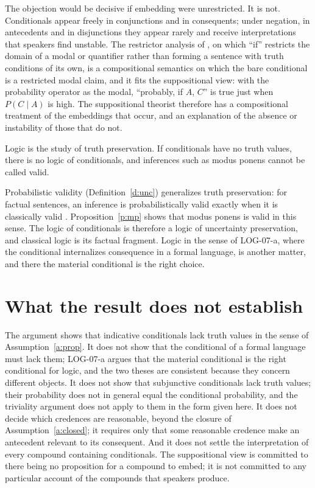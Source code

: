 \documentclass{situationist-preprint}
\begin{document}
\begin{reply}
The objection would be decisive if embedding were unrestricted. It is not. Conditionals appear freely in conjunctions and in consequents; under negation, in antecedents and in disjunctions they appear rarely and receive interpretations that speakers find unstable. The restrictor analysis of \citet{Kratzer1986}, on which \enquote{if} restricts the domain of a modal or quantifier rather than forming a sentence with truth conditions of its own, is a compositional semantics on which the bare conditional is a restricted modal claim, and it fits the suppositional view: with the probability operator as the modal, \enquote{probably, if $A$, $C$} is true just when $P(C \mid A)$ is high. The suppositional theorist therefore has a compositional treatment of the embeddings that occur, and an explanation of the absence or instability of those that do not.
\end{reply}

\begin{objection}[Logic]\label{o:logic}
Logic is the study of truth preservation. If conditionals have no truth values, there is no logic of conditionals, and inferences such as modus ponens cannot be called valid.
\end{objection}

\begin{reply}
Probabilistic validity (Definition~\ref{d:unc}) generalizes truth preservation: for factual sentences, an inference is probabilistically valid exactly when it is classically valid \citep{Adams1975}. Proposition~\ref{p:mp} shows that modus ponens is valid in this sense. The logic of conditionals is therefore a logic of uncertainty preservation, and classical logic is its factual fragment. Logic in the sense of LOG-07-a, where the conditional internalizes consequence in a formal language, is another matter, and there the material conditional is the right choice.
\end{reply}

\section{What the result does not establish}\label{s:not}

The argument shows that indicative conditionals lack truth values in the sense of Assumption~\ref{a:prop}. It does not show that the conditional of a formal language must lack them; LOG-07-a argues that the material conditional is the right conditional for logic, and the two theses are consistent because they concern different objects. It does not show that subjunctive conditionals lack truth values; their probability does not in general equal the conditional probability, and the triviality argument does not apply to them in the form given here. It does not decide which credences are reasonable, beyond the closure of Assumption~\ref{a:closed}; it requires only that some reasonable credence make an antecedent relevant to its consequent. And it does not settle the interpretation of every compound containing conditionals. The suppositional view is committed to there being no proposition for a compound to embed; it is not committed to any particular account of the compounds that speakers produce.
\end{document}
